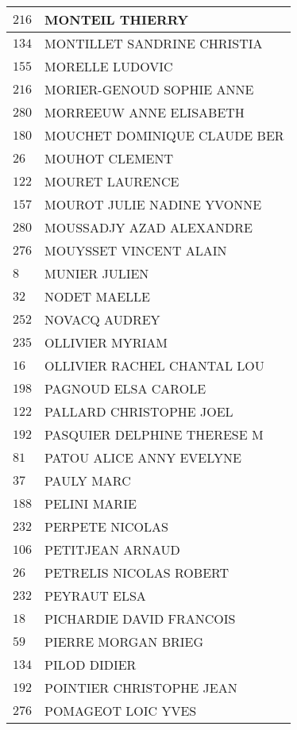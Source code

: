\begin{xltabular}{\linewidth}{|l|X|}
    \hline
    $216$ & MONTEIL THIERRY \\
    \hline
    $134$ & MONTILLET SANDRINE CHRISTIA \\
    \hline
    $155$ & MORELLE LUDOVIC \\
    \hline
    $216$ & MORIER-GENOUD SOPHIE ANNE \\
    \hline
    $280$ & MORREEUW ANNE ELISABETH \\
    \hline
    $180$ & MOUCHET DOMINIQUE CLAUDE BER \\
    \hline
    $26$ & MOUHOT CLEMENT \\
    \hline
    $122$ & MOURET LAURENCE \\
    \hline
    $157$ & MOUROT JULIE NADINE YVONNE \\
    \hline
    $280$ & MOUSSADJY AZAD ALEXANDRE \\
    \hline
    $276$ & MOUYSSET VINCENT ALAIN \\
    \hline
    $8$ & MUNIER JULIEN \\
    \hline
    $32$ & NODET MAELLE \\
    \hline
    $252$ & NOVACQ AUDREY \\
    \hline
    $235$ & OLLIVIER MYRIAM \\
    \hline
    $16$ & OLLIVIER RACHEL CHANTAL LOU \\
    \hline
    $198$ & PAGNOUD ELSA CAROLE \\
    \hline
    $122$ & PALLARD CHRISTOPHE JOEL \\
    \hline
    $192$ & PASQUIER DELPHINE THERESE M \\
    \hline
    $81$ & PATOU ALICE ANNY EVELYNE \\
    \hline
    $37$ & PAULY MARC \\
    \hline
    $188$ & PELINI MARIE \\
    \hline
    $232$ & PERPETE NICOLAS \\
    \hline
    $106$ & PETITJEAN ARNAUD \\
    \hline
    $26$ & PETRELIS NICOLAS ROBERT \\
    \hline
    $232$ & PEYRAUT ELSA \\
    \hline
    $18$ & PICHARDIE DAVID FRANCOIS \\
    \hline
    $59$ & PIERRE MORGAN BRIEG \\
    \hline
    $134$ & PILOD DIDIER \\
    \hline
    $192$ & POINTIER CHRISTOPHE JEAN \\
    \hline
    $276$ & POMAGEOT LOIC YVES \\

\end{xltabular}

